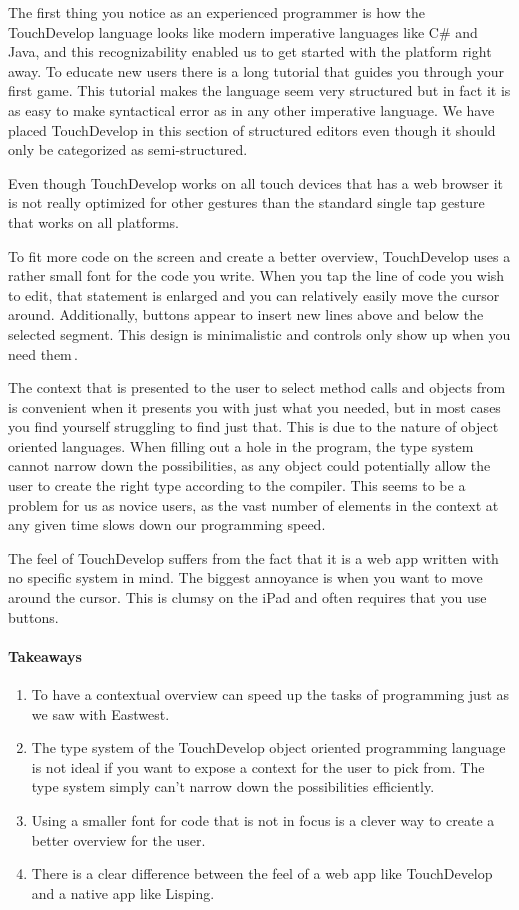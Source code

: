The first thing you notice as an experienced programmer is how the TouchDevelop language looks like modern imperative languages like C\# and Java, and this recognizability enabled us to get started with the platform right away. To educate new users there is a long tutorial that guides you through your first game. This tutorial makes the language seem very structured but in fact it is as easy to make syntactical error as in any other imperative language. We have placed TouchDevelop in this section of structured editors even though it should only be categorized as semi-structured.

Even though TouchDevelop works on all touch devices that has a web browser it is not really optimized for other gestures than the standard single tap gesture that works on all platforms.

To fit more code on the screen and create a better overview, TouchDevelop uses a rather small font for the code you write. When you tap the line of code you wish to edit, that statement is enlarged and you can relatively easily move the cursor around. Additionally, buttons appear to insert new lines above and below the selected segment. This design is minimalistic and controls only show up when you need them\,\cite{nielsen1990heuristic}.

The context that is presented to the user to select method calls and objects from is convenient when it presents you with just what you needed, but in most cases you find yourself struggling to find just that. This is due to the nature of object oriented languages. When filling out a hole in the program, the type system cannot narrow down the possibilities, as any object could potentially allow the user to create the right type according to the compiler. This seems to be a problem for us as novice users, as the vast number of elements in the context at any given time slows down our programming speed.

The feel of TouchDevelop suffers from the fact that it is a web app written with no specific system in mind. The biggest annoyance is when you want to move around the cursor. This is clumsy on the iPad and often requires that you use buttons.

\paragraph{Takeaways}
\begin{enumerate}
	\item To have a contextual overview can speed up the tasks of programming just as we saw with Eastwest.
	\item The type system of the TouchDevelop object oriented programming language is not ideal if you want to expose a context for the user to pick from. The type system simply can't narrow down the possibilities efficiently.
	\item Using a smaller font for code that is not in focus is a clever way to create a better overview for the user.
	\item There is a clear difference between the feel of a web app like TouchDevelop and a native app like Lisping.
\end{enumerate}

